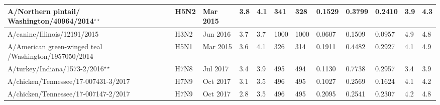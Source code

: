 \begin{tabular}{L{1.25in}|L{.35in}|L{.3in}|L{.3in}|L{.3in}|L{.35in}|L{.35in}|L{.35in}|L{.35in}|L{.32in}|L{.3in}|L{.3in}}
 A/Northern  pintail/ Washington/40964/2014$^{\star\star}$ &H5N2& Mar  2015 &3.8&4.1&341&328&0.1529&0.3799&0.2410&3.9&4.3\\\hline
 A/canine/Illinois/12191/2015 &H3N2& Jun  2016 &3.7&3.7&1000&1000&0.0607&0.1509&0.0957&4.9&4.8\\\hline
 A/American  green-winged  teal /Washington/1957050/2014 &H5N1& Mar 2015 &3.6&4.1&326&314&0.1911&0.4482&0.2927&4.1&4.9\\\hline
 A/turkey/Indiana/1573-2/2016$^{\star\star}$ &H7N8& Jul  2017 &3.4&3.9&495&494&0.1130&0.7738&0.2957&3.4&3.9\\\hline
 A/chicken/Tennessee/17-007431-3/2017 &H7N9& Oct  2017 &3.1&3.5&496&495&0.1027&0.2569&0.1624&4.1&4.2\\\hline
 A/chicken/Tennessee/17-007147-2/2017 &H7N9& Oct  2017 &2.8&3.5&496&495&0.2095&0.2541&0.2307&4.2&4.8\\\hline
 \end{tabular}